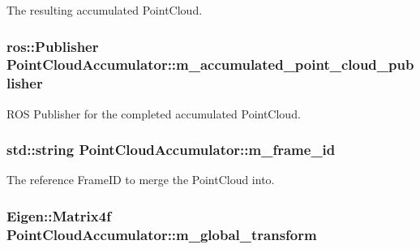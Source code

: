 \-The resulting accumulated \-Point\-Cloud. 

\hypertarget{class_point_cloud_accumulator_a117cbef73e39daeda50c32212a3cc603}{
\subsubsection[{m\-\_\-accumulated\-\_\-point\-\_\-cloud\-\_\-publisher}]{\setlength{\rightskip}{0pt plus 5cm}ros\-::\-Publisher {\bf \-Point\-Cloud\-Accumulator\-::m\-\_\-accumulated\-\_\-point\-\_\-cloud\-\_\-publisher}}}\label{class_point_cloud_accumulator_a117cbef73e39daeda50c32212a3cc603}


\-R\-O\-S \-Publisher for the completed accumulated \-Point\-Cloud. 

\hypertarget{class_point_cloud_accumulator_af8ef35b00c6d547b8d3fa89ad8a8b49a}{
\subsubsection[{m\-\_\-frame\-\_\-id}]{\setlength{\rightskip}{0pt plus 5cm}std\-::string {\bf \-Point\-Cloud\-Accumulator\-::m\-\_\-frame\-\_\-id}}}\label{class_point_cloud_accumulator_af8ef35b00c6d547b8d3fa89ad8a8b49a}


\-The reference \-Frame\-I\-D to merge the \-Point\-Cloud into. 

\hypertarget{class_point_cloud_accumulator_a7ea0dd4449475e6939cefbdb0fd260c5}{
\subsubsection[{m\-\_\-global\-\_\-transform}]{\setlength{\rightskip}{0pt plus 5cm}\-Eigen\-::\-Matrix4f {\bf \-Point\-Cloud\-Accumulator\-::m\-\_\-global\-\_\-transform}}}\label{class_point_cloud_accumulator_a7ea0dd4449475e6939cefbdb0fd260c5}


